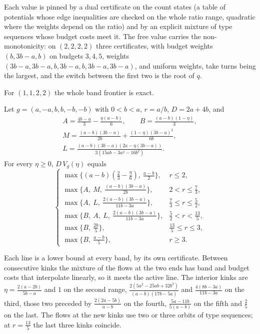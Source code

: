 Each value is pinned by a dual certificate on the count states (a table of potentials whose edge
inequalities are checked on the whole ratio range, quadratic where the weights depend on the
ratio) and by an explicit mixture of type sequences whose budget costs meet it. The free value
carries the non-monotonicity: on $(2,2,2,2)$ three certificates, with budget weights
$(b,3b-a,b)$ on budgets $3,4,5$, weights $(3b-a,3b-a,b,3b-a,b,3b-a,3b-a)$, and uniform weights,
take turns being the largest, and the switch between the first two is the root of $q$.

For $(1,1,2,2)$ the whole band frontier is exact.

\begin{theorem}
\label{thm:twomag1122}
Let $g=(a,-a,b,b,-b,-b)$ with $0<b<a$, $r=a/b$, $D=2a+4b$, and
\[
\begin{gathered}
A=\tfrac{4b-a}3-\tfrac{\eta(a-b)}6,\qquad B=\tfrac{(a-b)(1-\eta)}3,\\
M=\tfrac{(a-b)(3b-a)}{2b}+\tfrac{(1-\eta)(3b-a)^2}{6b},\\
L=\tfrac{(a-b)(3b-a)(2a-\eta(3b-a))}{3(15ab-3a^2-16b^2)}.
\end{gathered}
\]
For every $\eta\ge0$, $D\,V_g(\eta)$ equals
\[
\begin{cases}
\max\{(a-b)(\frac23-\frac\eta6),\ \frac{a-b}2\}, & r\le2,\\[2pt]
\max\{A,\ M,\ \frac{(a-b)(3b-a)}{2b}\}, & 2<r\le\frac73,\\[2pt]
\max\{A,\ L,\ \frac{2(a-b)(3b-a)}{11b-3a}\}, & \frac73\le r\le\frac52,\\[2pt]
\max\{B,\ A,\ L,\ \frac{2(a-b)(3b-a)}{11b-3a}\}, & \frac52<r<\frac{13}5,\\[2pt]
\max\{B,\ \frac{2b}5\}, & \frac{13}5\le r\le3,\\[2pt]
\max\{B,\ \frac{a-b}5\}, & r\ge3.
\end{cases}
\]
\end{theorem}

Each line is a lower bound at every band, by its own certificate. Between consecutive kinks the
mixture of the flows at the two ends has band and budget costs that interpolate linearly, so it
meets the active line. The interior kinks are $\eta=\frac{2(a-2b)}{5b-a}$ and $1$ on the second
range, $\frac{2(5a^2-25ab+32b^2)}{(a-b)(17b-5a)}$ and $\frac{4(8b-3a)}{11b-3a}$ on the third, those two
preceded by $\frac{2(2a-5b)}{a-b}$ on the fourth, $\frac{5a-11b}{5(a-b)}$ on the fifth and $\frac25$ on
the last. The flows at the new kinks use two or three orbits of type sequences; at $r=\frac{13}5$
the last three kinks coincide.

